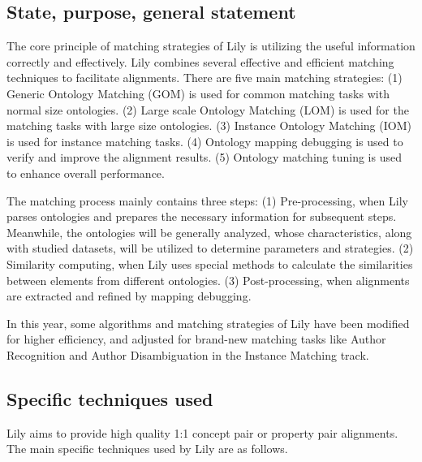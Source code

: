 \documentclass[runningheads]{llncs}
\begin{document}
\subsection{State, purpose, general statement}
The core principle of matching strategies of Lily is utilizing the useful information correctly and effectively. 
Lily combines several effective and efficient matching techniques to facilitate alignments. 
There are five main matching strategies: 
(1) Generic Ontology Matching (GOM) is used for common matching tasks with normal size ontologies. 
(2) Large scale Ontology Matching (LOM) is used for the matching tasks with large size ontologies. 
(3) Instance Ontology Matching (IOM) is used for instance matching tasks. 
(4) Ontology mapping debugging is used to verify and improve the alignment results. 
(5) Ontology matching tuning is used to enhance overall performance. \par
The matching process mainly contains three steps: 
(1) Pre-processing, when Lily parses ontologies and prepares the necessary information for subsequent steps. 
Meanwhile, the ontologies will be generally analyzed, whose characteristics, along with studied datasets, will be utilized to determine parameters and strategies. 
(2) Similarity computing, when Lily uses special methods to calculate the similarities between elements from different ontologies. 
(3) Post-processing, when alignments are extracted and refined by mapping debugging. \par
In this year, some algorithms and matching strategies of Lily have been modified for higher efficiency, and adjusted for brand-new matching tasks like Author Recognition and Author Disambiguation in the Instance Matching track. \par

\subsection{Specific techniques used}
Lily aims to provide high quality 1:1 concept pair or property pair alignments. 
The main specific techniques used by Lily are as follows. \par
\end{document}
